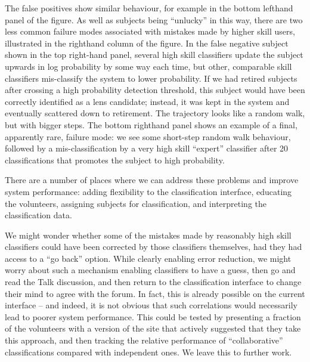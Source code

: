 \documentclass[useAMS,usenatbib,a4paper]{mn2e}
\begin{document}
The false positives show similar behaviour, for example in the bottom
lefthand panel of the figure. As well as subjects being ``unlucky'' in this
way, there are two less common failure modes associated with mistakes made by
higher skill users, illustrated in the righthand column of the figure. In the
false negative subject shown in the top right-hand panel, several high skill
classifiers update the subject upwards in log probability by some way each
time, but other, comparable skill classifiers mis-classify the system to lower
probability. If we had retired subjects after crossing a high probability
detection threshold, this subject would have been correctly identified as a
lens candidate; instead, it was kept in the system and eventually scattered
down to retirement. The trajectory looks like a random walk, but with bigger
steps. The bottom righthand panel shows an example of a final, apparently
rare, failure mode: we see some short-step random walk behaviour, followed by
a mis-classification by a very high skill ``expert'' classifier after 20
classifications that promotes the subject to high probability. 

There are a number of places where we can address these problems and
improve system performance: adding flexibility to the classification
interface, educating the volunteers, assigning subjects for
classification, and interpreting the classification data. 

We might wonder whether some of  the mistakes made by reasonably high skill
classifiers could have been corrected by those classifiers themselves, had
they had access to a ``go back'' option. While clearly enabling error
reduction, we might worry about such a mechanism enabling classifiers to have
a guess, then go and read the Talk discussion, and then return to the
classification interface to change their mind to agree with the forum. In
fact, this is already possible on the current interface -- and indeed, it is
not obvious that such correlations would necessarily lead to poorer system
performance. This could be tested by presenting a fraction of the volunteers
with a version of the site that actively suggested that they take this
approach, and then tracking the relative performance of ``collaborative''
classifications compared with independent ones. We leave this to further
work.  
\end{document}
